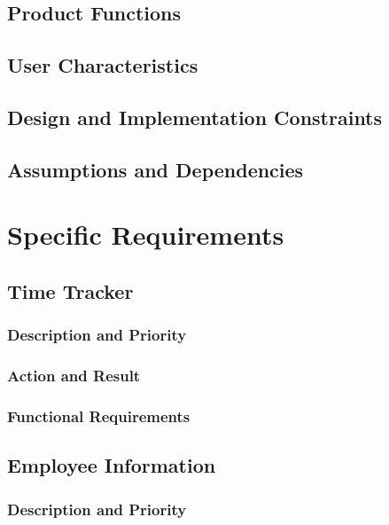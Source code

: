 \documentclass[letterpaper,10pt,titlepage,draftclsnofoot,onecolumn]{IEEEtran}
\begin{document}
\subsection{Product Functions}

\subsection{User Characteristics}

\subsection{Design and Implementation Constraints}

\subsection{Assumptions and Dependencies}

\section{Specific Requirements}

\subsection{Time Tracker}

\subsubsection{Description and Priority}

\subsubsection{Action and Result}

\subsubsection{Functional Requirements}

\subsection{Employee Information}

\subsubsection{Description and Priority}
\end{document}
